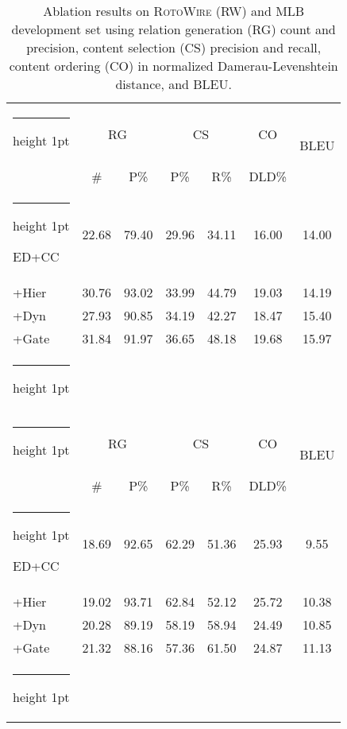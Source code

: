 \documentclass[11pt,a4paper]{article}
\makeatletter
\newcommand{\thickhline}{\noalign {\ifnum 0=`}\fi \hrule height 1pt
    \futurelet \reserved@a \@xhline
}
\makeatother
\begin{document}
\begin{table}[t]
\small
\centering
\begin{tabular}{ @{~}l@{~}|@{~}c@{~~}c|c@{~~}c|c|c@{~} } 
 \thickhline
\multirow{2}{*}{\textsc{RW}} &\multicolumn{2}{c|}{RG} &\multicolumn{2}{c|}{CS} & CO & \multirow{2}{*}{BLEU}\\ 

 &\# & P\% & P\% & R\% & DLD\% & \\ 
\thickhline
ED+CC & 22.68 &79.40 & 29.96 & 34.11 & 16.00 & 14.00 \\
+Hier&30.76 &93.02&33.99&44.79&19.03&14.19 \\
+Dyn&27.93 &90.85 &34.19 &42.27 &18.47 &15.40 \\ +Gate&31.84 &91.97 & 36.65 & 48.18 & 19.68 & 15.97 \\
\thickhline
\multicolumn{7}{c}{} \\  \thickhline
\multirow{2}{*}{MLB} &\multicolumn{2}{c|}{RG} &\multicolumn{2}{c|}{CS} & CO & \multirow{2}{*}{BLEU}\\ 
 &\# & P\% & P\% & R\% & DLD\% & \\ 
 \thickhline
ED+CC & 18.69 & 92.65 & 62.29 & 51.36 & 25.93 & 9.55 \\ 
+Hier &19.02 &93.71&62.84&52.12&25.72&10.38 \\
+Dyn&20.28 &89.19 &58.19 &58.94 &24.49 &10.85 \\ +Gate&21.32 & 88.16 & 57.36 & 61.50
 &24.87 & 11.13\\ 


\thickhline
\end{tabular}
\caption{\label{tbl:ablation-entity-memory-mlb}Ablation
  results on \textsc{RotoWire} (RW) and \textsc{MLB} development set using 
  relation generation (RG)  count and precision, content
  selection (CS) precision and recall, content ordering
  (CO) in normalized Damerau-Levenshtein distance,
  and BLEU.}
\end{table}
\end{document}
